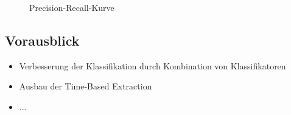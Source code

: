 \documentclass{beamer}
\begin{document}
\begin{frame}[plain]
\begin{figure}
\caption{Precision-Recall-Kurve}
\label{fig:prec-recall}
\end{figure}
\end{frame}

\subsection{Vorausblick}
\begin{frame}
  \begin{itemize}
    \item Verbesserung der Klassifikation durch Kombination von Klassifikatoren
    \item Ausbau der Time-Based Extraction
    \item ...
  \end{itemize}
\end{frame}
\end{document}
